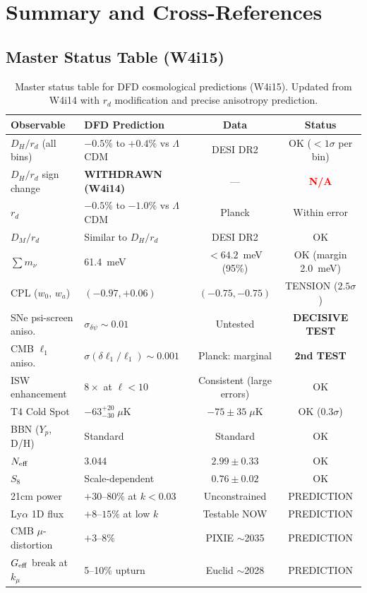 \documentclass[11pt,a4paper]{article}
\newcommand{\LCDM}{$\Lambda$CDM}
\newcommand{\Geff}{G_{\rm eff}}
\begin{document}
\section{Summary and Cross-References}

\subsection{Master Status Table (W4i15)}

\begin{table}[H]
\centering
\caption{Master status table for DFD cosmological predictions (W4i15).
Updated from W4i14 with $r_d$ modification and precise anisotropy
prediction.}
\label{tab:master-w4i15}
\small
\begin{tabular}{llcc}
\toprule
\textbf{Observable} & \textbf{DFD Prediction} & \textbf{Data} &
\textbf{Status} \\
\midrule
$D_H/r_d$ (all bins) & $-0.5\%$ to $+0.4\%$ vs \LCDM &
  DESI DR2 & OK ($< 1\sigma$ per bin) \\
$D_H/r_d$ sign change & \textbf{WITHDRAWN (W4i14)} & --- &
  \textcolor{red}{\textbf{N/A}} \\
$r_d$ & $-0.5\%$ to $-1.0\%$ vs \LCDM & Planck &
  Within error \\
$D_M/r_d$ & Similar to $D_H/r_d$ & DESI DR2 & OK \\
$\sum m_\nu$ & 61.4~meV & $< 64.2$~meV (95\%) &
  OK (margin 2.0~meV) \\
CPL ($w_0$, $w_a$) & $(-0.97, +0.06)$ &
  $(-0.75, -0.75)$ & TENSION ($2.5\sigma$) \\
SNe psi-screen aniso. & $\sigma_{\delta\psi} \sim 0.01$ &
  Untested & \textbf{DECISIVE TEST} \\
CMB $\ell_1$ aniso. & $\sigma(\delta\ell_1/\ell_1) \sim 0.001$ &
  Planck: marginal & \textbf{2nd TEST} \\
ISW enhancement & $8\times$ at $\ell < 10$ &
  Consistent (large errors) & OK \\
T4 Cold Spot & $-63^{+20}_{-30}\;\mu$K &
  $-75 \pm 35\;\mu$K & OK ($0.3\sigma$) \\
BBN ($Y_p$, D/H) & Standard & Standard & OK \\
$N_{\rm eff}$ & 3.044 & $2.99 \pm 0.33$ & OK \\
$S_8$ & Scale-dependent & $0.76 \pm 0.02$ & OK \\
21cm power & $+30$--$80\%$ at $k < 0.03$ &
  Unconstrained & PREDICTION \\
Ly$\alpha$ 1D flux & $+8$--$15\%$ at low $k$ &
  Testable NOW & PREDICTION \\
CMB $\mu$-distortion & $+3$--$8\%$ & PIXIE $\sim$2035 & PREDICTION \\
$\Geff$ break at $k_\mu$ & 5--10\% upturn &
  Euclid $\sim$2028 & PREDICTION \\
\bottomrule
\end{tabular}
\end{table}
\end{document}
